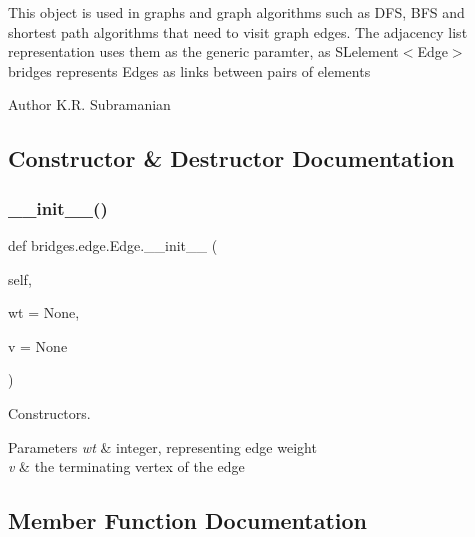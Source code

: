 This object is used in graphs and graph algorithms such as D\+FS, B\+FS and shortest path algorithms that need to visit graph edges. The adjacency list representation uses them as the generic paramter, as S\+Lelement$<$\+Edge$>$ bridges represents Edges as links between pairs of elements

\begin{DoxyAuthor}{Author}
K.\+R. Subramanian 
\end{DoxyAuthor}


\subsection{Constructor \& Destructor Documentation}
\mbox{\label{classbridges_1_1edge_1_1_edge_ae4c776878bf887da35276ec1aa2a789d}} 
\subsubsection{\texorpdfstring{\+\_\+\+\_\+init\+\_\+\+\_\+()}{\_\_init\_\_()}}
{\footnotesize\ttfamily def bridges.\+edge.\+Edge.\+\_\+\+\_\+init\+\_\+\+\_\+ (\begin{DoxyParamCaption}\item[{}]{self,  }\item[{}]{wt = {\ttfamily None},  }\item[{}]{v = {\ttfamily None} }\end{DoxyParamCaption})}



Constructors. 


\begin{DoxyParams}{Parameters}
{\em wt} & integer, representing edge weight \\
\hline
{\em v} & the terminating vertex of the edge \\
\hline
\end{DoxyParams}


\subsection{Member Function Documentation}
\mbox{\label{classbridges_1_1edge_1_1_edge_a406b906ea8e177a6e54f6c794c04df3d}} 
